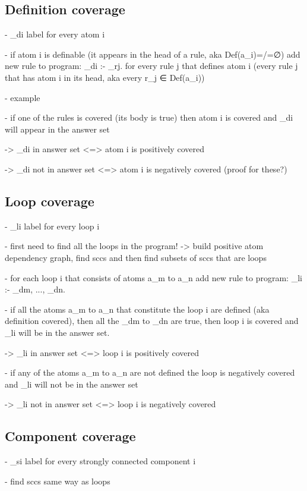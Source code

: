 \subsection{Definition coverage}
\label{subsec:Implementation/General approach/Definition coverage}
- _di label for every atom i

- if atom i is definable (it appears in the head of a rule, aka Def(a_i)=/=∅) add new rule to program: _di :- _rj. for every rule j that defines atom i 
(every rule j that has atom i in its head, aka every r_j ∈ Def(a_i))

- example

- if one of the rules is covered (its body is true) then atom i is covered and _di will appear in the answer set

-> _di in answer set <=> atom i is positively covered

-> _di not in answer set <=> atom i is negatively covered (proof for these?)

\subsection{Loop coverage}
\label{subsec:Implementation/General approach/Loop coverage}
- _li label for every loop i

- first need to find all the loops in the program! -> build positive atom dependency graph, find sccs and then find subsets of sccs 
that are loops

- for each loop i that consists of atoms a_m to a_n add new rule to program: _li :- _dm, ..., _dn.

- if all the atoms a_m to a_n that constitute the loop i are defined (aka definition covered), then all the _dm to _dn are true, 
then loop i is covered and _li will be in the answer set.

-> _li in answer set <=> loop i is positively covered

- if any of the atoms a_m to a_n are not defined the loop is negatively covered and  _li will not be in the answer set

-> _li not in answer set <=> loop i is negatively covered

\subsection{Component coverage}
\label{subsec:Implementation/General approach/Component coverage}
- _si label for every strongly connected component i

- find sccs same way as loops

